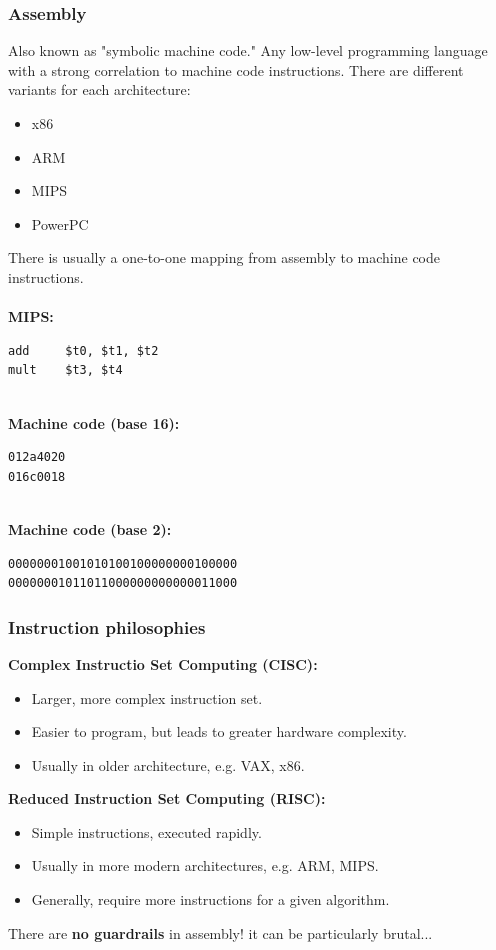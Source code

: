 \documentclass[11pt]{article}
\begin{document}
\subsubsection{Assembly}
Also known as "symbolic machine code." Any low-level programming language with a strong correlation to machine code instructions.
There are different variants for each architecture:
\begin{itemize}
    \item x86
    \item ARM
    \item MIPS
    \item PowerPC
\end{itemize}
There is usually a one-to-one mapping from assembly to machine code instructions.
\\\\
\textbf{MIPS:}
\begin{lstlisting}
add     $t0, $t1, $t2
mult    $t3, $t4
\end{lstlisting}
$\quad$\\[-1em]
\textbf{Machine code (base 16):}
\begin{lstlisting}
012a4020
016c0018
\end{lstlisting}
$\quad$\\[-1em]
\textbf{Machine code (base 2):}
\begin{lstlisting}
00000001001010100100000000100000
00000001011011000000000000011000
\end{lstlisting}

\subsubsection{Instruction philosophies}
\textbf{Complex Instructio Set Computing (CISC):}
\begin{itemize}
    \item Larger, more complex instruction set.
    \item Easier to program, but leads to greater hardware complexity.
    \item Usually in older architecture, e.g. VAX, x86.
\end{itemize}
\textbf{Reduced Instruction Set Computing (RISC):}
\begin{itemize}
    \item Simple instructions, executed rapidly.
    \item Usually in more modern architectures, e.g. ARM, MIPS.
    \item Generally, require more instructions for a given algorithm.
\end{itemize}
\begin{warning}[Important]
There are \textbf{no guardrails} in assembly! it can be particularly brutal...
\end{warning}
\end{document}
